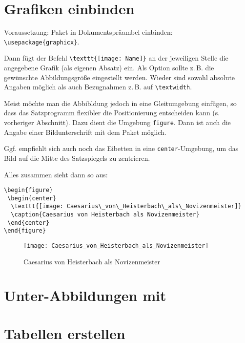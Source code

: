 
\section{Grafiken einbinden}

Voraussetzung: Paket  in Dokumentspräambel einbinden:
\lstinline/\usepackage{graphicx}/.

Dann fügt der Befehl \lstinline/\texttt{[image: Name]}/ an der jeweiligen Stelle
die angegebene Grafik (als eigenen Absatz) ein.
Als Option sollte z.\,B. die gewünschte Abbildungsgröße eingestellt werden.
Wieder sind sowohl absolute Angaben möglich als auch Bezugnahmen z.\,B. auf 
\lstinline/\textwidth/.

Meist möchte man die Abbibldung jedoch in eine Gleitumgebung einfügen, so dass das Satzprogramm
flexibler die Positionierung entscheiden kann (s. vorheriger Abschnitt).
Dazu dient die Umgebung \lstinline/figure/.
Dann ist auch die Angabe einer Bildunterschrift mit dem Paket  möglich.

Ggf. empfiehlt sich auch noch das Eibetten in eine \lstinline/center/-Umgebung,
um das Bild auf die Mitte des Satzspiegels zu zentrieren.

Alles zusammen sieht dann so aus:

\begin{lstlisting}
\begin{figure}
 \begin{center}
  \texttt{[image: Caesarius\_von\_Heisterbach\_als\_Novizenmeister]}
  \caption{Caesarius von Heisterbach als Novizenmeister}
 \end{center}
\end{figure} 
\end{lstlisting}


\begin{figure}[!htb]
\centering
  \texttt{[image: Caesarius\_von\_Heisterbach\_als\_Novizenmeister]}
  \caption{Caesarius von Heisterbach als Novizenmeister}
\end{figure}

\section{Unter-Abbildungen mit \protect{}}


\section{Tabellen erstellen}

